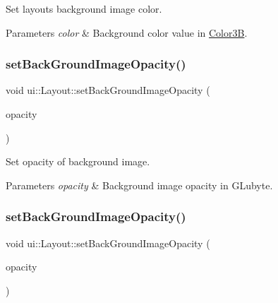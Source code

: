 Set layout\textquotesingle{}s background image color. 
\begin{DoxyParams}{Parameters}
{\em color} & Background color value in {\ttfamily \hyperlink{structColor3B}{Color3B}}. \\
\hline
\end{DoxyParams}
\mbox{\label{classui_1_1Layout_a736ea1d892fa9343b03a3c6a1b92ac38}} 
\subsubsection{\texorpdfstring{set\+Back\+Ground\+Image\+Opacity()}{setBackGroundImageOpacity()}\hspace{0.1cm}{\footnotesize\ttfamily [1/2]}}
{\footnotesize\ttfamily void ui\+::\+Layout\+::set\+Back\+Ground\+Image\+Opacity (\begin{DoxyParamCaption}\item[{G\+Lubyte}]{opacity }\end{DoxyParamCaption})}

Set opacity of background image. 
\begin{DoxyParams}{Parameters}
{\em opacity} & Background image opacity in G\+Lubyte. \\
\hline
\end{DoxyParams}
\mbox{\label{classui_1_1Layout_a736ea1d892fa9343b03a3c6a1b92ac38}} 
\subsubsection{\texorpdfstring{set\+Back\+Ground\+Image\+Opacity()}{setBackGroundImageOpacity()}\hspace{0.1cm}{\footnotesize\ttfamily [2/2]}}
{\footnotesize\ttfamily void ui\+::\+Layout\+::set\+Back\+Ground\+Image\+Opacity (\begin{DoxyParamCaption}\item[{G\+Lubyte}]{opacity }\end{DoxyParamCaption})}


